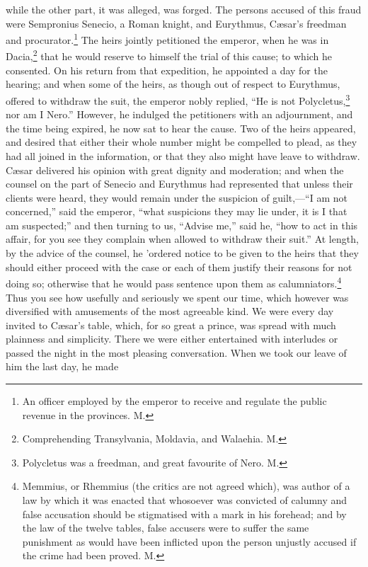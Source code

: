 while the other part, it was alleged, was forged. The persons accused of
this fraud were Sempronius Senecio, a Roman knight, and Eurythmus, Cæsar's
freedman and procurator.\footnote{An officer employed by
the emperor to receive and regulate the public revenue in the provinces.
M.} The heirs jointly petitioned the emperor,
when he was in Dacia,\footnote{Comprehending
Transylvania, Moldavia, and Walaehia. M.} that he would reserve to himself the trial
of this cause; to which he consented. On his return from that expedition,
he appointed a day for the hearing; and when some of the heirs, as though
out of respect to Eurythmus, offered to withdraw the suit, the emperor
nobly replied, ``He is not Polycletus,\footnote{Polycletus was a
freedman, and great favourite of Nero. M.} nor am I Nero.''
However, he indulged the petitioners with an adjournment, and the time
being expired, he now sat to hear the cause. Two of the heirs appeared,
and desired that either their whole number might be compelled to plead, as
they had all joined in the information, or that they also might have leave
to withdraw. Cæsar delivered his opinion with great dignity and
moderation; and when the counsel on the part of Senecio and Eurythmus had
represented that unless their clients were heard, they would remain under
the suspicion of guilt,—``I am not concerned,'' said the emperor,
``what suspicions they may lie under, it is I that am suspected;'' and then
turning to us, ``Advise me,'' said he, ``how to act in this affair, for you
see they complain when allowed to withdraw their suit.'' At length, by the
advice of the counsel, he 'ordered notice to be given to the heirs that
they should either proceed with the case or each of them justify their
reasons for not doing so; otherwise that he would pass sentence upon them
as calumniators.\footnote{Memmius, or Rhemmius
(the critics are not agreed which), was author of a law by which it was
enacted that whosoever was convicted of calumny and false accusation
should be stigmatised with a mark in his forehead; and by the law of the
twelve tables, false accusers were to suffer the same punishment as would
have been inflicted upon the person unjustly accused if the crime had been
proved. M.} Thus you see how usefully and seriously we
spent our time, which however was diversified with amusements of the most
agreeable kind. We were every day invited to Cæsar's table, which, for so
great a prince, was spread with much plainness and simplicity. There we
were either entertained with interludes or passed the night in the most
pleasing conversation. When we took our leave of him the last day, he made

